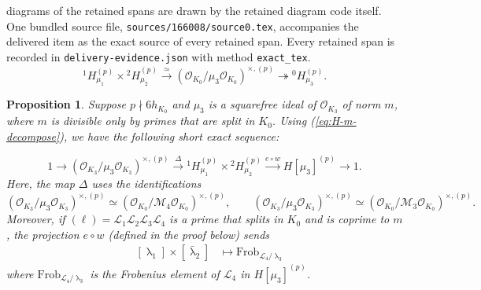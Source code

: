 \documentclass[10pt,a4paper]{amsart}
\theoremstyle{plain}
\newtheorem{prop}[thm]{Proposition}
\theoremstyle{definition}
\theoremstyle{remark}
\def\cL{{\mathcal L}}
\def\cM{\mathcal M}
\def\cO{\mathcal O}
\DeclareMathOperator{\la}{\lambda}
\begin{document}
diagrams of the retained spans are drawn by the retained diagram code itself. One bundled source file, \texttt{sources/166008/source0.tex}, accompanies the delivered item as the exact source of every retained span. Every retained span is recorded in \texttt{delivery-evidence.json} with method \texttt{exact\_tex}.
\begin{equation}\label{eq:H-m-decompose}
    ^{1}H_{\mu_1}^{(p)}\times {^{2}H}_{\mu_2}^{(p)} \xrightarrow{\simeq} (\cO_{K_0}/\mu_3\cO_{K_0})^{\times,(p)} \twoheadrightarrow {^{0}H_{\mu_3}^{(p)}}.
\end{equation}

\begin{prop}\label{ringclass} Suppose $p\nmid 6h_{K_0}$ and $\mu_3$ is a squarefree ideal of $\cO_{K_3}$ of norm $m$, where $m$ is divisible only by primes that are split in $K_0$. Using (\ref{eq:H-m-decompose}), we have the following short exact sequence:

\[
1\rightarrow(\cO_{K_3}/\mu_3\cO_{K_3})^{\times, (p)}\xrightarrow{\Delta}{^{1}H}_{\mu_1}^{(p)}\times {^{2}H}_{\mu_2}^{(p)}\xrightarrow{e\circ w} H[\mu_3]^{(p)}\rightarrow 1.
\]
Here, the map $\Delta$ uses the identifications 
\[(\cO_{K_3}/\mu_3\cO_{K_3})^{\times,(p)} \simeq (\cO_{K_0}/\cM_4\cO_{K_0})^{\times,(p)},\qquad (\cO_{K_3}/\mu_3\cO_{K_3})^{\times,(p)} \simeq (\cO_{K_0}/\cM_3\cO_{K_0})^{\times,(p)}.
\]
Moreover, if $(\ell)=\cL_1\cL_2\cL_3\cL_4$ is a prime that splits in $K_0$ and is coprime to $m$, the projection $e\circ w$ (defined in the proof below) sends 
\begin{align*}
      \quad  [\la_1]\times[\bar{\la}_2]&\mapsto \mathrm{Frob}_{\cL_4/\la_3} 
    \end{align*}
where $\mathrm{Frob}_{\cL_4/\la_3} $ is the Frobenius element of $\cL_4$ in $H[\mu_3]^{(p)}$. 
\end{prop}
\end{document}
